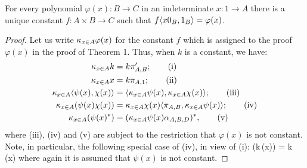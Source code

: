 \begin{theorem}
For every polynomial $\varphi(x):B \to C$ in an indeterminate $x: 1 \to A$
there is a unique constant $f: A \times B \to C$ such that $f\langle x0_B,1_B \rangle = \varphi(x)$.
\end{theorem}
\begin{proof}
Let us write $\kappa_{x \in A} \varphi(x)$ for the constant $f$ which is assigned to the proof $\varphi(x)$
in the proof of Theorem 1. Thus, when $k$ is a constant, we have:
\begin{align*}
\kappa_{x \in A} k &= k\pi'_{A,B}; \tag{i}\\
\kappa_{x \in A} x &= k\pi_{A,1}; \tag{ii}\\
\kappa_{x \in A} \langle \psi(x),\chi(x) \rangle &= \langle \kappa_{x \in A}\psi(x),\kappa_{x \in A}\chi(x) \rangle; \tag{iii}\\
\kappa_{x \in A} (\psi(x) \chi(x))&= \kappa_{x \in A}\chi(x)\langle \pi_{A,B}, \kappa_{x \in A}\psi(x) \rangle;\tag{iv}\\
\kappa_{x \in A} (\psi(x)^*) &= (\kappa_{x \in A}\psi(x)\alpha_{A,B,D})^*, \tag{v}
\end{align*}
where (iii), (iv) and (v) are subject to the restriction that $\varphi(x)$ is not constant.
Note, in particular, the following special case of (iv), in view of (i):
\bes
\kxa(k\,\psi(x)) = k \,\kxa \psi(x)
\ees
where again it is assumed that $\psi(x)$ is not constant.


\end{proof}

